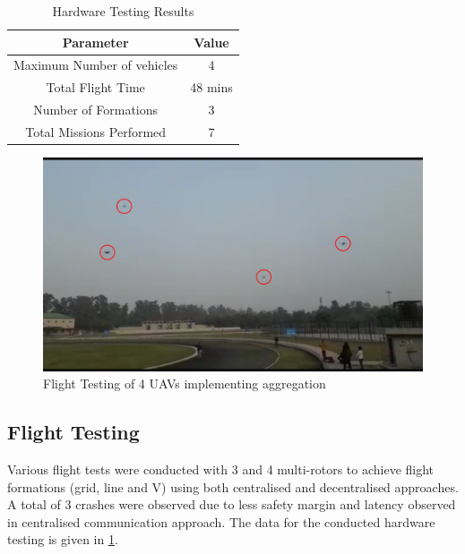 \begin{spacing}{2}
\begin{table}
    \centering
    \caption{Hardware Testing Results}
    \begin{tabular}{c|c}
         Parameter &  Value\\\hline
         Maximum Number of vehicles & 4 \\
         Total Flight Time & 48 mins \\
         Number of Formations & 3 \\
         Total Missions Performed & 7 
    \end{tabular}
    
    \label{tab:flightresult}
\end{table}

\begin{figure}[h]
    \centering
    \includegraphics[width=\linewidth]{image/swarm_quad.png}
    \caption{Flight Testing of 4 UAVs implementing aggregation}
    \label{fig:hardwaretest}
\end{figure}

\subsection{Flight Testing}
Various flight tests were conducted with 3 and 4 multi-rotors to achieve flight formations (grid, line and V) using both centralised and decentralised approaches. A total of 3 crashes were observed due to less safety margin and latency observed in centralised communication approach. The data for the conducted hardware testing is given in \ref{tab:flightresult}.

\end{spacing}